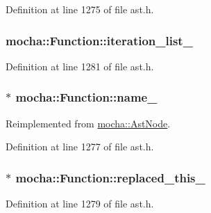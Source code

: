 Definition at line 1275 of file ast.h.

\hypertarget{classmocha_1_1_function_a4ac68f0b0e7ed2a47d6d340d1d75777b}{
\subsubsection[{iteration\_\-list\_\-}]{ {\bf mocha::Function::iteration\_\-list\_\-}}}
\label{classmocha_1_1_function_a4ac68f0b0e7ed2a47d6d340d1d75777b}


Definition at line 1281 of file ast.h.

\hypertarget{classmocha_1_1_function_ac2e4d75b6c293a0f2d6344df8cdc10e7}{
\subsubsection[{name\_\-}]{$\ast$ {\bf mocha::Function::name\_\-}}}
\label{classmocha_1_1_function_ac2e4d75b6c293a0f2d6344df8cdc10e7}


Reimplemented from \hyperlink{classmocha_1_1_ast_node_a876b49852a3151d977c842a90ee02771}{mocha::AstNode}.



Definition at line 1277 of file ast.h.

\hypertarget{classmocha_1_1_function_a06bcbfa74031bdac59acc8d0bbc46e2c}{
\subsubsection[{replaced\_\-this\_\-}]{$\ast$ {\bf mocha::Function::replaced\_\-this\_\-}}}
\label{classmocha_1_1_function_a06bcbfa74031bdac59acc8d0bbc46e2c}


Definition at line 1279 of file ast.h.

